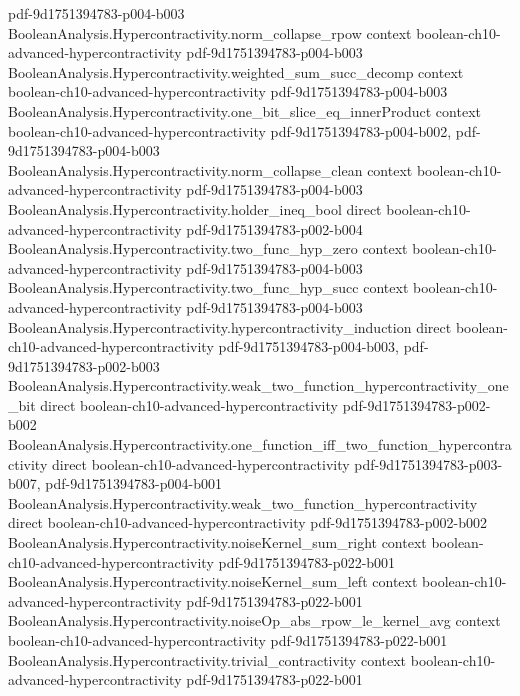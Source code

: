 \begin{theorem}
  {pdf-9d1751394783-p004-b003}
\proofstep
  {BooleanAnalysis.Hypercontractivity.norm_collapse_rpow}
  {context}
  {boolean-ch10-advanced-hypercontractivity}
  {pdf-9d1751394783-p004-b003}
\proofstep
  {BooleanAnalysis.Hypercontractivity.weighted_sum_succ_decomp}
  {context}
  {boolean-ch10-advanced-hypercontractivity}
  {pdf-9d1751394783-p004-b003}
\proofstep
  {BooleanAnalysis.Hypercontractivity.one_bit_slice_eq_innerProduct}
  {context}
  {boolean-ch10-advanced-hypercontractivity}
  {pdf-9d1751394783-p004-b002,
    pdf-9d1751394783-p004-b003}
\proofstep
  {BooleanAnalysis.Hypercontractivity.norm_collapse_clean}
  {context}
  {boolean-ch10-advanced-hypercontractivity}
  {pdf-9d1751394783-p004-b003}
\proofstep
  {BooleanAnalysis.Hypercontractivity.holder_ineq_bool}
  {direct}
  {boolean-ch10-advanced-hypercontractivity}
  {pdf-9d1751394783-p002-b004}
\proofstep
  {BooleanAnalysis.Hypercontractivity.two_func_hyp_zero}
  {context}
  {boolean-ch10-advanced-hypercontractivity}
  {pdf-9d1751394783-p004-b003}
\proofstep
  {BooleanAnalysis.Hypercontractivity.two_func_hyp_succ}
  {context}
  {boolean-ch10-advanced-hypercontractivity}
  {pdf-9d1751394783-p004-b003}
\proofstep
  {BooleanAnalysis.Hypercontractivity.hypercontractivity_induction}
  {direct}
  {boolean-ch10-advanced-hypercontractivity}
  {pdf-9d1751394783-p004-b003,
    pdf-9d1751394783-p002-b003}
\proofstep
  {BooleanAnalysis.Hypercontractivity.weak_two_function_hypercontractivity_one_bit}
  {direct}
  {boolean-ch10-advanced-hypercontractivity}
  {pdf-9d1751394783-p002-b002}
\proofstep
  {BooleanAnalysis.Hypercontractivity.one_function_iff_two_function_hypercontractivity}
  {direct}
  {boolean-ch10-advanced-hypercontractivity}
  {pdf-9d1751394783-p003-b007,
    pdf-9d1751394783-p004-b001}
\proofstep
  {BooleanAnalysis.Hypercontractivity.weak_two_function_hypercontractivity}
  {direct}
  {boolean-ch10-advanced-hypercontractivity}
  {pdf-9d1751394783-p002-b002}
\proofstep
  {BooleanAnalysis.Hypercontractivity.noiseKernel_sum_right}
  {context}
  {boolean-ch10-advanced-hypercontractivity}
  {pdf-9d1751394783-p022-b001}
\proofstep
  {BooleanAnalysis.Hypercontractivity.noiseKernel_sum_left}
  {context}
  {boolean-ch10-advanced-hypercontractivity}
  {pdf-9d1751394783-p022-b001}
\proofstep
  {BooleanAnalysis.Hypercontractivity.noiseOp_abs_rpow_le_kernel_avg}
  {context}
  {boolean-ch10-advanced-hypercontractivity}
  {pdf-9d1751394783-p022-b001}
\proofstep
  {BooleanAnalysis.Hypercontractivity.trivial_contractivity}
  {context}
  {boolean-ch10-advanced-hypercontractivity}
  {pdf-9d1751394783-p022-b001}
\proofstep

\end{theorem}

